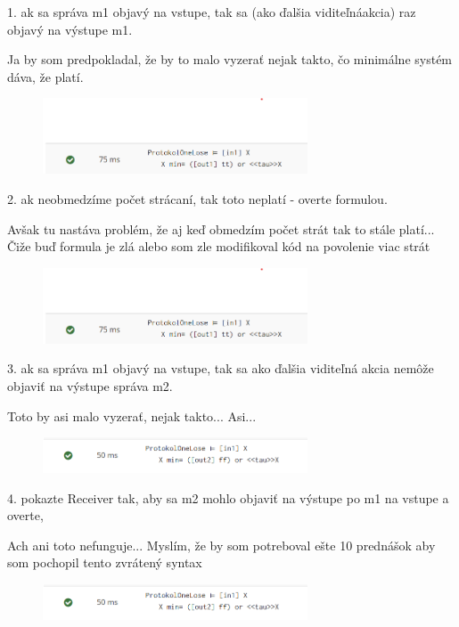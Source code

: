 \documentclass[a4paper]{article}
\begin{document}
1. ak sa správa m1 objavý na vstupe, tak sa (ako ďalšia viditeľnáakcia) raz objavý na výstupe m1.

Ja by som predpokladal, že by to malo vyzerať nejak takto, čo minimálne systém dáva, že platí.

\begin{figure}[!h]
	\centering
	\includegraphics[width=0.7\textwidth]{1.png}
\end{figure}

2. ak neobmedzíme počet strácaní, tak toto neplatí - overte formulou.

Avšak tu nastáva problém, že aj keď obmedzím počet strát tak to stále platí... Čiže buď formula je zlá alebo som zle modifikoval kód na povolenie viac strát

\begin{figure}[!h]
	\centering
	\includegraphics[width=0.7\textwidth]{1.png}
\end{figure}

3. ak sa správa m1 objavý na vstupe, tak sa ako ďalšia viditeľná akcia nemôže objaviť na výstupe správa m2.

Toto by asi malo vyzerať, nejak takto... Asi...

\begin{figure}[!h]
	\centering
	\includegraphics[width=0.7\textwidth]{3.png}
\end{figure}
\newpage

4. pokazte Receiver tak, aby sa m2 mohlo objaviť na výstupe po m1 na vstupe a overte, 

Ach ani toto nefunguje... Myslím, že by som potreboval ešte 10 prednášok aby som pochopil tento zvrátený syntax

\begin{figure}[!h]
	\centering
	\includegraphics[width=0.7\textwidth]{3.png}
\end{figure}
\end{document}
